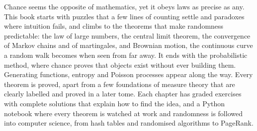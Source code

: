 Chance seems the opposite of mathematics, yet it obeys laws as precise as any. This book starts with puzzles that a few
lines of counting settle and paradoxes where intuition fails, and climbs to the theorems that make randomness
predictable: the law of large numbers, the central limit theorem, the convergence of Markov chains and of martingales,
and Brownian motion, the continuous curve a random walk becomes when seen from far away. It ends with the probabilistic
method, where chance proves that objects exist without ever building them. Generating functions, entropy and Poisson
processes appear along the way. Every theorem is proved, apart from a few foundations of measure theory that are
clearly labelled and proved in a later tome. Each chapter has graded exercises with complete
solutions that explain how to find the idea, and a Python notebook where every theorem is watched at work and
randomness is followed into computer science, from hash tables and randomised algorithms to PageRank.
